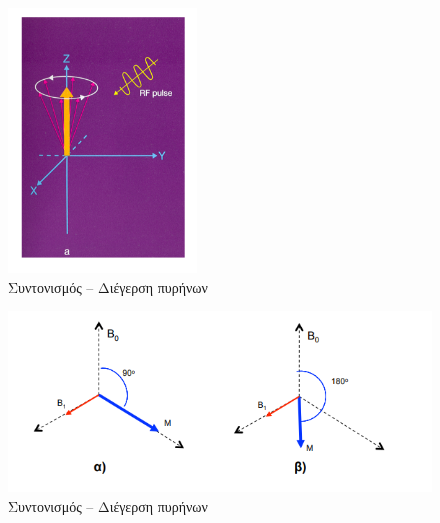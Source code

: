 \documentclass{article}
\begin{document}
\begin{figure}[h!]	
     \centering
     
  \includegraphics[width=50mm,scale=0.6]{t1.png}
  \caption{Συντονισμός	–	Διέγερση	πυρήνων}
\end{figure}

\begin{figure}[h!]	
     \centering
     
  \includegraphics[width=120mm,scale=1.8]{t2.png}
  \caption{Συντονισμός	–	Διέγερση	πυρήνων}
\end{figure}
\clearpage
\end{document}
